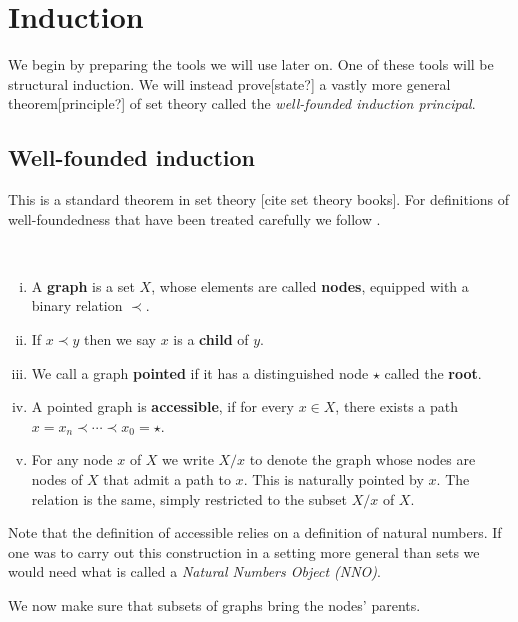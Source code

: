 
\section{Induction}

We begin by preparing the tools we will use later on. One of these tools will be structural induction. We will instead prove[state?] a vastly more general theorem[principle?] of set theory called the \textit{well-founded induction principal}.

\subsection{Well-founded induction}

This is a standard theorem in set theory [cite set theory books]. For definitions of well-foundedness that have been treated carefully we follow \cite[\S 8]{2018arXiv180805204S}.

\begin{defin}\ 
    \begin{enumerate}[(i)]
        \item A \textbf{graph} is a set $X$, whose elements are called \textbf{nodes}, equipped with a binary relation $\prec$.
        \item If $x \prec y$ then we say $x$ is a \textbf{child} of $y$.
        \item We call a graph \textbf{pointed} if it has a distinguished node $\star$ called the \textbf{root}.
        \item A pointed graph is \textbf{accessible}, if for every $x \in X$, there exists a path $x = x_n \prec \cdots \prec x_0 = \star$.
        \item For any node $x$ of $X$ we write $X/x$ to denote the graph whose nodes are nodes of $X$ that admit a path to $x$. This is naturally pointed by $x$. The relation is the same, simply restricted to the subset $X/x$ of $X$.
    \end{enumerate}
\end{defin}

\begin{remark}
    Note that the definition of accessible relies on a definition of natural numbers. If one was to carry out this construction in a setting more general than sets we would need what is called a \textit{Natural Numbers Object (NNO)}.
\end{remark}

We now make sure that subsets of graphs bring the nodes' parents.

